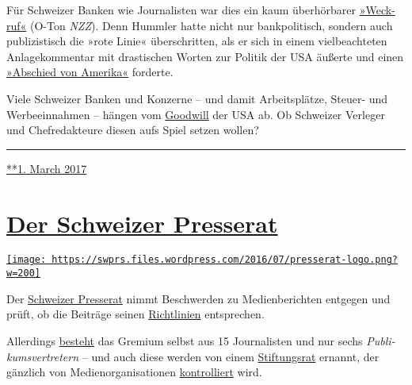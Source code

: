Für Schweizer Banken wie Journalisten war dies ein kaum über­hör­ba­rer
\href{http://www.nzz.ch/ein-weckruf-fuer-die-schweiz-1.14608280}{»Weck­ruf«}
(O-Ton \emph{NZZ}). Denn Hummler hatte nicht nur bank­politisch, sondern
auch publi­zistisch die »rote Linie« über­schritten, als er sich in
einem viel­beachteten An­la­ge­kom­men­tar mit dras­ti­schen Worten zur
Po­li­tik der USA äußerte und einen
\href{https://swprs.files.wordpress.com/2016/03/usa_wegelin_kommentar_2009.pdf}{»Abschied
von Amerika«} forderte.

Viele Schwei­zer Banken und Konzerne -- und da­mit Ar­beits­plätze,
Steuer- und Werbe­ein­nah­men -- hän­gen vom
\href{http://www.finews.ch/news/finanzplatz/21359-us-steuerstreit-kategorie-2-kategorie-1-lombard-odier-julius-b\%C3\%A4r-department-of-justice}{Good­will}
der USA ab. Ob Schweizer Ver­le­ger und Chef­re­dak­teure diesen aufs
Spiel setzen wollen?

\begin{center}\rule{0.5\linewidth}{\linethickness}\end{center}

\href{https://swprs.org/2017/03/01/abschied-von-usa-kritikern/}{**1.
March 2017}

\hypertarget{der-schweizer-presserat}{%
\section{\texorpdfstring{\href{https://swprs.org/2017/03/01/der-schweizer-presserat/}{Der
Schweizer
Presserat}}{Der Schweizer Presserat}}\label{der-schweizer-presserat}}

\href{https://swprs.org/2017/03/01/der-schweizer-presserat/}{\texttt{[image: https://swprs.files.wordpress.com/2016/07/presserat-logo.png?w=200]}}

Der \href{https://presserat.ch/}{Schweizer Presse­rat} nimmt
Be­schwer­den zu Me­dien­be­rich­ten ent­ge­gen und prüft, ob die
Beiträge seinen
\href{https://presserat.ch/journalistenkodex/richtlinien/}{Richt­linien}
ent­spre­chen.

Aller­dings
\href{https://presserat.ch/der-presserat/presseratsmitglieder/}{besteht}
das Gre­mium selbst aus 15 Jour­na­listen und nur sechs
\emph{Pub­li­kums­ver­tre­tern} -- und auch diese werden von einem
\href{https://presserat.ch/der-presserat/stiftungsratsmitglieder/}{Stif‌­tungs­rat}
er­nannt, der gänz­lich von Medien­orga­ni­sa­tionen
\href{https://presserat.ch/der-presserat/geschaeftsreglement/}{kon­trol­liert}
wird.

